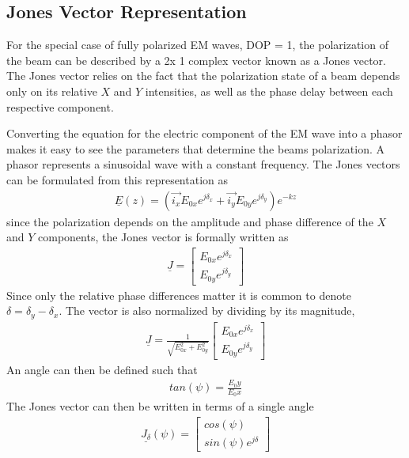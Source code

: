 \subsection{Jones Vector Representation}
For the special case of fully polarized EM waves, DOP = 1, the polarization of the beam can be described by a 2x 1 complex vector known as a Jones vector.  The Jones vector relies on the fact that the polarization state of a beam depends only on its relative $X$ and $Y$ intensities, as well as the phase delay between each respective component.

Converting the equation for the electric component of the EM wave into a phasor makes it easy to see the parameters that determine the beams polarization.  A phasor represents a sinusoidal wave with a constant frequency.  The Jones vectors can be formulated from this representation as
%
\begin{align}
    \underline{\hat{E}}(z)=(\vec{i_x} E_{0x} e^{j\delta_x}+\vec{i_y} E_{0y} e^{j\delta_y })e^{-kz}
\end{align}
%
since the polarization depends on the amplitude and phase difference of the $X$ and $Y$ components, the Jones vector is formally written as
%
\begin{align}
    \underline{J} =
    \begin{bmatrix}
        E_{0x} e^{j\delta_x} \\
        E_{0y} e^{j\delta_y }
    \end{bmatrix}
\end{align}
%
Since only the relative phase differences matter it is common to denote $\delta=\delta_y-\delta_x$.  The vector is also normalized by dividing by its magnitude,
%
\begin{align}
    \underline{J} =
    \frac{1}{\sqrt{E_{0x}^2 + E_{0y}^2}}
    \begin{bmatrix}
        E_{0x} e^{j\delta_x} \\
        E_{0y} e^{j\delta_y }
    \end{bmatrix}
\end{align}
%
An angle can then be defined such that
%
\begin{align}
    tan(\psi) = \frac{E_0y}{E_0x}
\end{align}
%
The Jones vector can then be written in terms of a single angle
%
\begin{align}
    \underline{J_{\delta}}(\psi) =
    \begin{bmatrix}
        cos(\psi) \\
        sin(\psi)e^{j\delta}
    \end{bmatrix}
\end{align}
